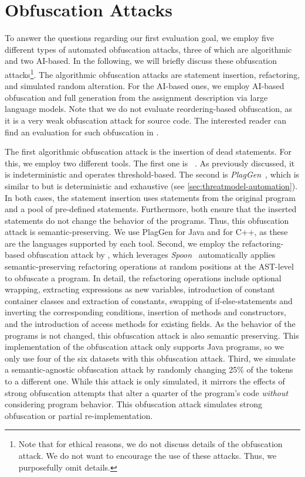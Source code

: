 
\section{Obfuscation Attacks}
To answer the questions regarding our first evaluation goal, we employ five different types of automated obfuscation attacks, three of which are algorithmic and two AI-based.
In the following, we will briefly discuss these obfuscation attacks\footnote{Note that for ethical reasons, we do not discuss details of the obfuscation attack. We do not want to encourage the use of these attacks. Thus, we purposefully omit details.}.
The algorithmic obfuscation attacks are statement insertion, refactoring, and simulated random alteration.
For the AI-based ones, we employ AI-based obfuscation and full generation from the assignment description via large language models.
Note that we do not evaluate reordering-based obfuscation, as it is a very weak obfuscation attack for source code.
The interested reader can find an evaluation for such obfuscation in .
 
The first algorithmic obfuscation attack is the insertion of dead statements.
For this, we employ two different tools. The first one is \mossad~\cite{DevoreMcDonald2020}. As previously discussed, it is indeterministic and operates threshold-based. The second is \textit{PlagGen}~\cite{Broedel2023}, which is similar to \mossad but is deterministic and exhaustive (see \autoref{sec:threatmodel-automation}). In both cases, the statement insertion uses statements from the original program and a pool of pre-defined statements. Furthermore, both ensure that the inserted statements do not change the behavior of the programs. Thus, this obfuscation attack is semantic-preserving. We use PlagGen for Java and \mossad for C++, as these are the languages supported by each tool.
%
Second, we employ the refactoring-based obfuscation attack by \citet{Maisch2024}, which leverages \textit{Spoon}~\cite{Pawlak2006} automatically applies semantic-preserving refactoring operations at random positions at the AST-level to obfuscate a program.
In detail, the refactoring operations include optional wrapping, extracting expressions as new variables, introduction of constant container classes and extraction of constants, swapping of if-else-statements and inverting the corresponding conditions, insertion of methods and constructors, and the introduction of access methods for existing fields.
As the behavior of the programs is not changed, this obfuscation attack is also semantic preserving.
This implementation of the obfuscation attack only supports Java programs, so we only use four of the six datasets with this obfuscation attack.
%
Third, we simulate a semantic-agnostic obfuscation attack by randomly changing 25\% of the tokens to a different one. While this attack is only simulated, it mirrors the effects of strong obfuscation attempts that alter a quarter of the program's code \textit{without} considering program behavior. This obfuscation attack simulates strong obfuscation or partial re-implementation.

